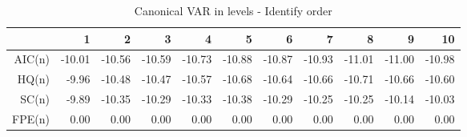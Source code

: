\begin{table}[ht]
\centering
\caption{Canonical VAR in levels - Identify order} 
\begin{tabular}{rrrrrrrrrrr}
  \hline
 & 1 & 2 & 3 & 4 & 5 & 6 & 7 & 8 & 9 & 10 \\ 
  \hline
AIC(n) & -10.01 & -10.56 & -10.59 & -10.73 & -10.88 & -10.87 & -10.93 & -11.01 & -11.00 & -10.98 \\ 
  HQ(n) & -9.96 & -10.48 & -10.47 & -10.57 & -10.68 & -10.64 & -10.66 & -10.71 & -10.66 & -10.60 \\ 
  SC(n) & -9.89 & -10.35 & -10.29 & -10.33 & -10.38 & -10.29 & -10.25 & -10.25 & -10.14 & -10.03 \\ 
  FPE(n) & 0.00 & 0.00 & 0.00 & 0.00 & 0.00 & 0.00 & 0.00 & 0.00 & 0.00 & 0.00 \\ 
   \hline
\end{tabular}
\end{table}

